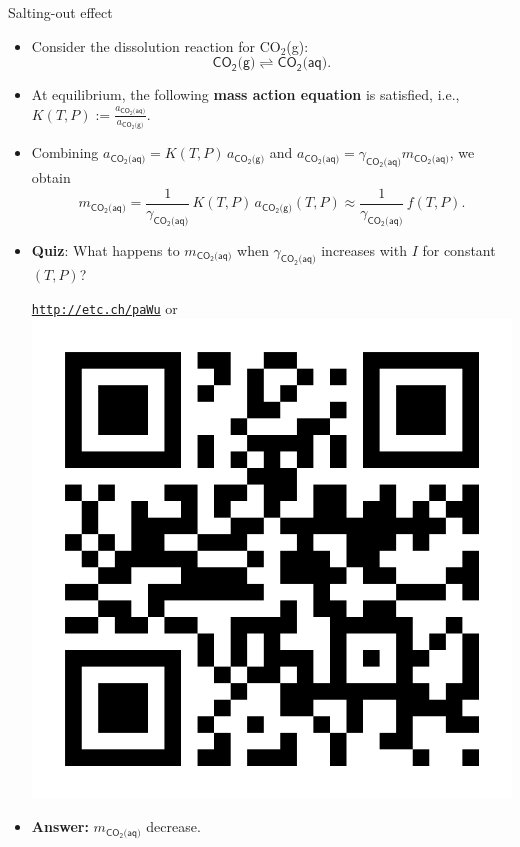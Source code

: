 \begin{frame}[<+->]{Salting-out effect}

\small
\begin{itemize}
\item Consider the dissolution reaction for CO$_{2}$(g):
\[
\mathsf{CO_{2}\text{(g)}}\rightleftharpoons\mathsf{CO_{2}\text{(aq)}}.
\]
\item At equilibrium, the following \textbf{mass action equation} is satisfied, i.e., 
%
$K(T, P) := \frac{a_{\mathsf{CO_{2}\text{(aq)}}}}{a_{\mathsf{CO_{2}\text{(g)}}}}$.
\item Combining $a_{\mathsf{CO_{2}\text{(aq)}}} = K(T, P) \, a_{\mathsf{CO_{2}\text{(g)}}}$ and 
$a_{\mathsf{CO_{2}\text{(aq)}}}=\gamma_{\mathsf{CO_{2}\text{(aq)}}}m_{\mathsf{CO_{2}\text{(aq)}}}$, we obtain 
\[
m_{\mathsf{CO_{2}\text{(aq)}}}=\frac{1}{\gamma_{\mathsf{CO_{2}\text{(aq)}}}} \, K(T, P) \, a_{\mathsf{CO_{2}\text{(g)}}}(T, P)
\approx \frac{1}{\gamma_{\mathsf{CO_{2}\text{(aq)}}}} \, f(T, P).
\]
\item \alert{\textbf{Quiz}}: What happens to $m_{\mathsf{CO_{2}\text{(aq)}}}$ when $\gamma_{\mathsf{CO_{2}\text{(aq)}}}$
increases with $I$ for constant $(T, P)$?
\begin{center}
	\href{http://etc.ch/paWu}{\textcolor{indigo(dye)}{\tt http://etc.ch/paWu}} \quad or \quad 
	\includegraphics[height=0.14\columnwidth]{figures/activity-models/poll-ionic-strength.png}
\end{center}
\hiddenpause
\item \textbf{Answer:} $m_{\mathsf{CO_{2}\text{(aq)}}}$ decrease. 
\end{itemize}
\end{frame}
%
%
